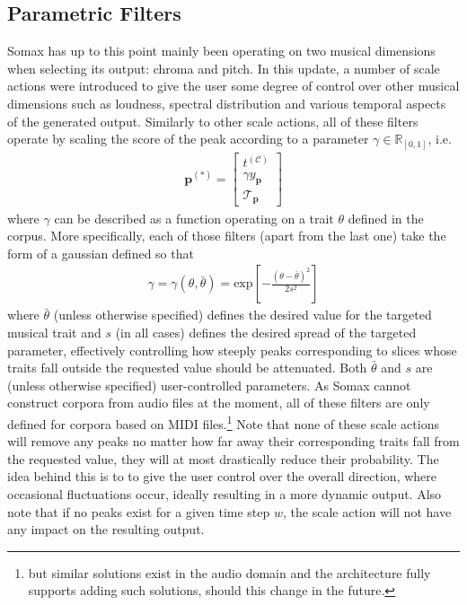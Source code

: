 \subsection{Parametric Filters}
Somax has up to this point mainly been operating on two musical dimensions when selecting its output: chroma and pitch. In this update, a number of scale actions were introduced to give the user some degree of control over other musical dimensions such as loudness, spectral distribution and various temporal aspects of the generated output.  Similarly to other scale actions, all of these filters operate by scaling the score of the peak according to a parameter $\gamma \in \mathbb R_{[0,1]}$, i.e.
	\begin{align}\label{eq:filter-scaling}
		\bm p^{(\ast)} = \begin{bmatrix}
			t^{(\mathcal C)} \\ \gamma y_{\bm p} \\ \mathcal T_{\bm p}
		\end{bmatrix}
	\end{align}
	where $\gamma$ can be described as a function operating on a trait $\theta$  defined in the corpus. More specifically, each of those filters (apart from the last one) take the form of a gaussian defined so that
	\begin{align}
		\gamma = \gamma\left(\theta,\bar{\theta}\right) = \text{exp}\left[-\frac{(\theta-\bar{\theta})^2}{2s^2}\right]
	\end{align}
	where $\bar{\theta}$ (unless otherwise specified) defines the desired value for the targeted musical trait and $s$ (in all cases) defines the desired spread of the targeted parameter, effectively controlling how steeply peaks corresponding to slices whose traits fall outside the requested value should be attenuated. Both $\bar{\theta}$ and $s$ are (unless otherwise specified) user-controlled parameters. As Somax cannot construct corpora from audio files at the moment, all of these filters are only defined for corpora based on MIDI files.\footnote{but similar solutions exist in the audio domain and the architecture fully supports adding such solutions, should this change in the future.} Note that none of these scale actions will remove any peaks no matter how far away their corresponding traits fall from the requested value, they will at most drastically reduce their probability. The idea behind this is to to give the user control over the overall direction, where occasional fluctuations occur, ideally resulting in a more dynamic output. Also note that if no peaks exist for a given time step $w$, the scale action will not have any impact on the resulting output.
	
